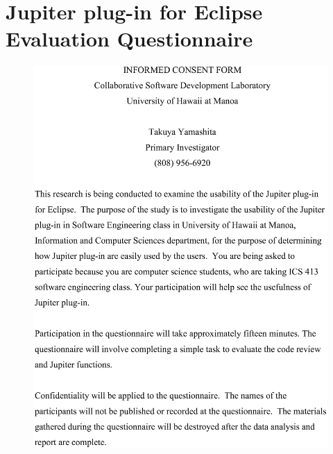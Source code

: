 \appendix
\chapter{Jupiter plug-in for Eclipse Evaluation Questionnaire}
\label{appendix:JupiterQuestionnaire}

\begin{figure}[htbp]
  \centering
  \includegraphics[width=1.0\textwidth]{figures/JupiterQuestionnaire_1.eps}
  \label{fig:JupiterQuestionnaire_1}
\end{figure}

